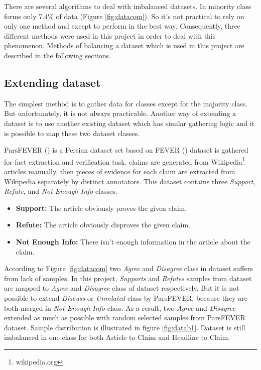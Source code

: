 \bigbreak
There are several algorithms to deal with imbalanced datasets. In \cite{stance_persian} minority class forms only 7.4\% of data (Figure \ref{fig:datacom}). So it's not practical to rely on only one method and except to perform in the best way. Consequently, three different methods were used in this project in order to deal with this phenomenon. Methods of balancing a dataset which is used in this project are described in the following sections.  
	
\subsection{Extending dataset}
The simplest method is to gather data for classes except for the majority class. But unfortunately, it is not always practicable. Another way of extending a dataset is to use another existing dataset which has similar gathering logic and it is possible to map these two dataset classes. 

ParsFEVER (\cite{parsfever}) is a Persian dataset set based on FEVER (\cite{fever}) dataset is gathered for fact extraction and verification task. \cite{parsfever} claims are generated from Wikipedia\footnote{wikipedia.org} articles manually, then pieces of evidence for each claim are extracted from Wikipedia separately by distinct annotators. This dataset contains three \textit{Support}, \textit{Refute}, and \textit{Not Enough Info} classes. 
\begin{itemize}
	\item {\color{green!70!black}\textbf{Support:}} The article obviously proves the given claim. 
	\item {\color{red!60!black}\textbf{Refute:}} The article obviously disproves the given claim.
	\item {\color{gray}\textbf{Not Enough Info:}} There isn't enough information in the article about the claim. 
\end{itemize}                

According to Figure \ref{fig:datacom} two \textit{Agree} and \textit{Disagree} class in \cite{stance_persian} dataset suffers from lack of samples. In this project, \textit{Supports} and \textit{Refutes} samples from \cite{parsfever} dataset are mapped to \textit{Agree} and \textit{Disagree} class of \cite{stance_persian} dataset respectively. 
But it is not possible to extend \textit{Discuss} or \textit{Unrelated} class by ParsFEVER, because they are both merged in \textit{Not Enough Info} class. As a result, two \textit{Agree} and \textit{Disagree} extended as much as possible with random selected samples from ParsFEVER dataset. Sample distribution is illustrated in figure \ref{fig:datab1}. Dataset is still imbalanced in one class for both Article to Claim and Headline to Claim.

